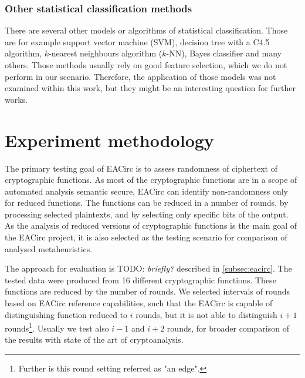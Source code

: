 \documentclass[
  print, %
  Table,   %
  nolof,     %
  nolot,     %
  11pt, %
  oneside  %
]{fithesis3}
\newcommand{\todo}[1]{TODO: \textit{#1}}
\begin{document}

\subsection{Other statistical classification methods}


There are several other models or algorithms of statistical classification. Those are for example support vector machine (SVM), decision tree with a C4.5 algorithm, $k$-nearest neighbours algorithm ($k$-NN), Bayes classifier and many others. Those methods usually rely on good feature selection, which we do not perform in our scenario. Therefore, the application of those models was not examined within this work, but they might be an interesting question for further works.

\chapter{Experiment methodology}
\label{chap:method}

The primary testing goal of EACirc is to assess randomness of ciphertext of cryptographic functions. As most of the cryptographic functions are in a scope of automated analysis semantic secure, EACirc can identify non-randomness only for reduced functions. The functions can be reduced in a number of rounds, by processing selected plaintexts, and by selecting only specific bits of the output. As the analysis of reduced versions of cryptographic functions is the main goal of the EACirc project, it is also selected as the testing scenario for comparison of analysed metaheuristics.

The approach for evaluation is \todo{briefly?} described in \cref{subsec:eacirc}. The tested data were produced from 16 different cryptographic functions. These functions are reduced by the number of rounds. We selected intervals of rounds based on EACirc reference capabilities, such that the EACirc is capable of distinguishing function reduced to $i$ rounds, but it is not able to distinguish $i+1$ rounds\footnote{Further is this round setting referred as "an edge".}. Usually we test also $i-1$ and $i+2$ rounds, for broader comparison of the results with state of the art of cryptoanalysis.
\end{document}
